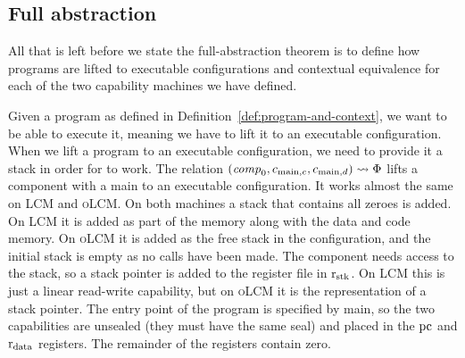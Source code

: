\documentclass[acmsmall,review,anonymous]{acmart}\settopmatter{printfolios=true,printccs=false,printacmref=false}
\renewcommand{\comp}{\var{comp}}
\newcommand{\trgcm}{\textsc{LCM}}
\newcommand{\srccm}{\textsc{oLCM}}
\begin{document}
\subsection{Full abstraction}
All that is left before we state the full-abstraction theorem is to define how programs are lifted to executable configurations and contextual equivalence for each of the two capability machines we have defined.

Given a program as defined in Definition~\ref{def:program-and-context}, we want to be able to execute it, meaning we have to lift it to an executable configuration.
When we lift a program to an executable configuration, we need to provide it a stack in order for \stktokens{} to work.
The relation $(\comp_0, c_{\mathrm{main},c}, c_{\mathrm{main},d}) \rightsquigarrow \Phi$ lifts a component with a main to an executable configuration.
It works almost the same on \trgcm{} and \srccm{}.
On both machines a stack that contains all zeroes is added.
On \trgcm{} it is added as part of the memory along with the data and code memory.
On \srccm{} it is added as the free stack in the configuration, and the initial stack is empty as no calls have been made.
The component needs access to the stack, so a stack pointer is added to the register file in $\mathrm{r}_\mathrm{stk}$.
On \trgcm{} this is just a linear read-write capability, but on \srccm{} it is the representation of a stack pointer.
The entry point of the program is specified by main, so the two capabilities are unsealed (they must have the same seal) and placed in the $\mathrm{pc}$ and $\mathrm{r}_\mathrm{data}$ registers.
The remainder of the registers contain zero.
\end{document}
